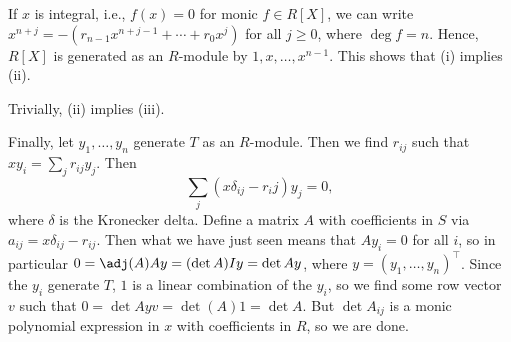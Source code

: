 If $x$ is integral, i.e., $f(x) = 0$ for monic $f \in R[X]$, we can write
$x^{n+j} = -(r_{n-1}x^{n+j-1} + \cdots + r_0x^j)$ for all $j\geq 0$, where
$\deg f = n$. Hence, $R[X]$ is generated as an $R$-module by
$1, x, \ldots, x^{n-1}$. This shows that (i) implies (ii).

Trivially, (ii) implies (iii).

Finally, let $y_1, \ldots, y_n$ generate $T$ as an $R$-module. Then we find
$r_{ij}$ such that $xy_i = \sum_j r_{ij}y_j$. Then
\[ \sum_j (x\delta_{ij}-r_ij)y_j = 0, \]
where $\delta$ is the Kronecker delta. Define a matrix $A$ with coefficients in
$S$ via $a_{ij} = x\delta_{ij} - r_{ij}$. Then what we have just seen means that
$Ay_i = 0$ for all $i$, so in particular $0 = \adj(A)Ay = (\det A)Iy= \det A y$,
where $y = (y_1, \ldots, y_n)^\top$. Since the $y_i$ generate $T$, $1$ is a linear
combination of the $y_i$, so we find some row vector $v$ such that
$0 = \det A yv = \det(A) 1 = \det A$. But $\det A_{ij}$ is a monic polynomial
expression in $x$ with coefficients in $R$, so we are done.
